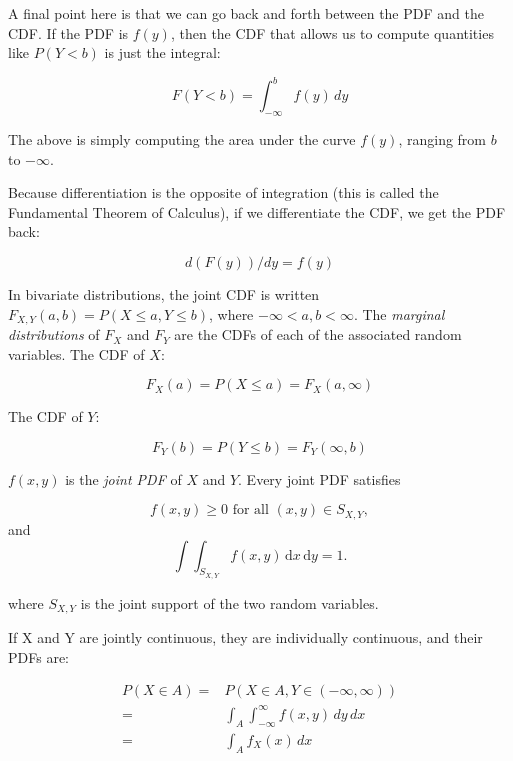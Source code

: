 \documentclass[
  12pt,
]{krantz}
\theoremstyle{definition}
\theoremstyle{definition}
\theoremstyle{definition}
\theoremstyle{definition}
\theoremstyle{remark}
\begin{document}
\begin{blackbox}
A final point here is that we can go back and forth between the PDF and the CDF. If the PDF is \(f(y)\), then the CDF that allows us to compute quantities like \(P(Y<b)\) is just the integral:

\begin{equation}
F(Y<b)=\int_{-\infty}^b f(y)\, dy
\end{equation}

The above is simply computing the area under the curve \(f(y)\), ranging from \(b\) to \(-\infty\).

Because differentiation is the opposite of integration (this is called the Fundamental Theorem of Calculus), if we differentiate the CDF, we get the PDF back:

\begin{equation}
d(F(y))/dy=f(y)
\end{equation}

In bivariate distributions, the joint CDF is written \(F_{X,Y}(a,b)=P(X\leq a, Y\leq b)\), where \(-\infty < a,b<\infty\). The \emph{marginal distributions} of \(F_X\) and \(F_Y\) are the CDFs of each of the associated random variables. The CDF of \(X\):

\begin{equation}
F_X(a) = P(X\leq a) = F_X(a,\infty) 
\end{equation}

The CDF of \(Y\):

\begin{equation}
F_Y(b) = P(Y\leq b) = F_Y(\infty,b) 
\end{equation}

\(f(x,y)\) is the \emph{joint PDF} of \(X\) and \(Y\). Every joint PDF satisfies

\begin{equation}
f(x,y)\geq 0\mbox{ for all }(x,y)\in S_{X,Y},
\end{equation}
and
\begin{equation}
\int \int_{S_{X,Y}}f(x,y)\,\mathrm{d} x\,\mathrm{d} y=1.
\end{equation}

where \(S_{X,Y}\) is the joint support of the two random variables.

If X and Y are jointly continuous, they are individually continuous, and their PDFs are:

\begin{equation}
\begin{split}
P(X\in A) = & P(X\in A, Y\in (-\infty,\infty))  \\
= & \int_A \int_{-\infty}^{\infty} f(x,y)\,dy\, dx\\
= & \int_A f_X(x)\, dx
\end{split} 
\end{equation}


\end{blackbox}
\end{document}
